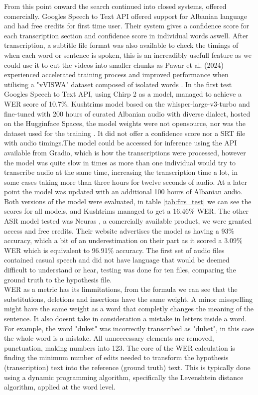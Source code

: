 \documentclass[12pt]{article}
\begin{document}
From this point onward the search continued into closed systems, offered comercially. Googles Speech to Text API offered support for Albanian language and had free credits for first time user. Their system gives a confidence score for each transcription section and confidence score in individual words aswell. After transcription, a subtitle file format was also available to check the timings of when each word or sentence is spoken, this is an increadibly usefull feature as we could use it to cut the videos into smaller chunks as Pawar et al. (2024) experienced accelerated training process and improved performance when utilising a "vVISWA" dataset composed of isolated words \cite{PAWAR2024100084}. In the first test Googles Speech to Text API, using Chirp 2 as a model, managed to achieve a WER score of 10.7\%. Kushtrims model based on the whisper-large-v3-turbo and fine-tuned with 200 hours of curated Albanian audio with diverse dialect, hosted on the Hugginface Spaces, the model weights were not opensource, nor was the dataset used for the training \cite{kushtrim}. It did not offer a confidence score nor a SRT file with audio timings.The model could be accessed for inference using the API available from Gradio, which is how the transcriptions were processed, however the model was quite slow in times as more than one individual would try to transcribe audio at the same time, increasing the transcription time a lot, in some cases taking more than three hours for twelve seconds of audio. At a later point the model was updated with an additional 100 hours of Albanian audio. Both versions of the model were evaluated, in table \ref{tab:firs_test} we can see the scores for all models, and Kushtrims managed to get a 16.46\% WER. The other ASR model tested was Neuras \cite{neura}, a comercially available product, we were granted access and free credits. Their website advertises the model as having a 93\% accuracy, which a bit of an underestimation on their part as it scored a 3.09\% WER which is equivalent to 96.91\% accuracy. The first set of audio files contained casual speech and did not have language that would be deemed difficult to understand or hear, testing was done for ten files, comparing the ground truth to the hypothesis file.\\
WER as a metric has its limmitations, from the formula we can see that the substitutions, deletions and insertions have the same weight. A minor misspelling might have the same weight as a word that completly changes the meaning of the sentence. It also doesnt take in consideration a mistake in letters inside a word. For example, the word "duket" was incorrectly transcribed as "duhet", in this case the whole word is a mistake. All unneccessary elements are removed, punctuation, making numbers into 123. The core of the WER calculation is finding the minimum number of edits needed to transform the hypothesis (transcription) text into the reference (ground truth) text. This is typically done using a dynamic programming algorithm, specifically the Levenshtein distance algorithm, applied at the word level.
\end{document}
